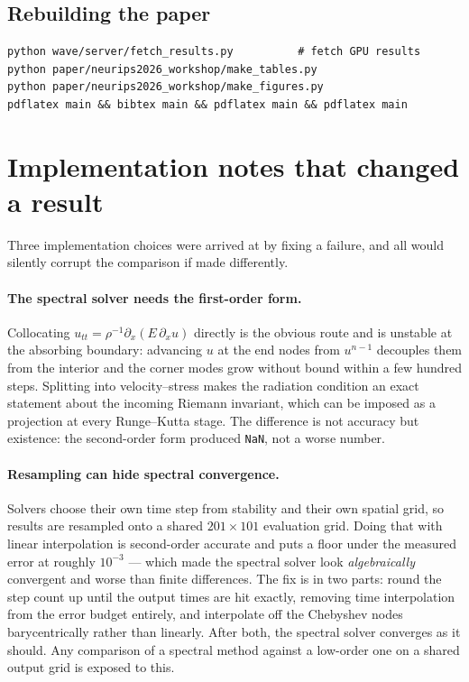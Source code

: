\subsection{Rebuilding the paper}

\begin{verbatim}
python wave/server/fetch_results.py          # fetch GPU results
python paper/neurips2026_workshop/make_tables.py
python paper/neurips2026_workshop/make_figures.py
pdflatex main && bibtex main && pdflatex main && pdflatex main
\end{verbatim}

\section{Implementation notes that changed a result}
\label{app:impl}

Three implementation choices were arrived at by fixing a failure, and all would
silently corrupt the comparison if made differently.

\paragraph{The spectral solver needs the first-order form.} Collocating
$u_{tt} = \rho^{-1}\partial_x(E\,\partial_x u)$ directly is the obvious route
and is unstable at the absorbing boundary: advancing $u$ at the end nodes from
$u^{n-1}$ decouples them from the interior and the corner modes grow without
bound within a few hundred steps. Splitting into velocity--stress makes the
radiation condition an exact statement about the incoming Riemann invariant,
which can be imposed as a projection at every Runge--Kutta stage. The
difference is not accuracy but existence: the second-order form produced
\texttt{NaN}, not a worse number.

\paragraph{Resampling can hide spectral convergence.} Solvers choose their own
time step from stability and their own spatial grid, so results are resampled
onto a shared $201 \times 101$ evaluation grid. Doing that with linear
interpolation is second-order accurate and puts a floor under the measured
error at roughly $10^{-3}$ --- which made the spectral solver look
\emph{algebraically} convergent and worse than finite differences. The fix is
in two parts: round the step count up until the output times are hit exactly,
removing time interpolation from the error budget entirely, and interpolate off
the Chebyshev nodes barycentrically rather than linearly. After both, the
spectral solver converges as it should. Any comparison of a spectral method
against a low-order one on a shared output grid is exposed to this.

